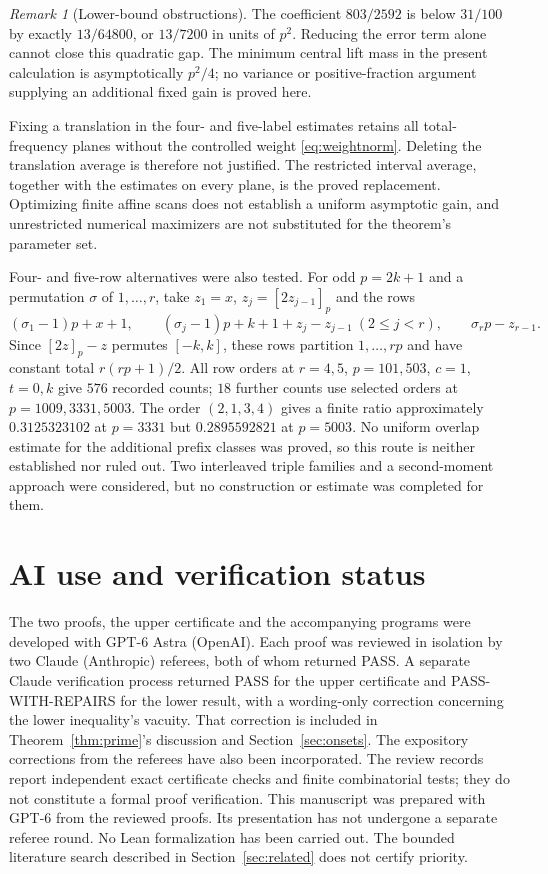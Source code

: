 \documentclass[10pt]{amsart}
\theoremstyle{remark}
\newtheorem{remark}[lemma]{Remark}
\begin{document}
\begin{remark}[Lower-bound obstructions]
The coefficient $803/2592$ is below $31/100$ by exactly $13/64800$,
or $13/7200$ in units of $p^2$. Reducing the error term alone cannot
close this quadratic gap. The minimum central lift mass in the
present calculation is asymptotically $p^2/4$; no variance or
positive-fraction argument supplying an additional fixed gain is
proved here.

Fixing a translation in the four- and five-label estimates retains
all total-frequency planes without the controlled weight
\eqref{eq:weightnorm}. Deleting the translation average is therefore
not justified. The restricted interval average, together with the
estimates on every plane, is the proved replacement.
Optimizing finite affine scans does not establish a uniform
asymptotic gain, and unrestricted numerical maximizers are not
substituted for the theorem's parameter set.

Four- and five-row alternatives were also tested. For odd $p=2k+1$
and a permutation $\sigma$ of $1,\ldots,r$, take $z_1=x$,
$z_j=[2z_{j-1}]_p$ and the rows
\[
 (\sigma_1-1)p+x+1,\qquad
 (\sigma_j-1)p+k+1+z_j-z_{j-1}\ (2\le j<r),\qquad
 \sigma_rp-z_{r-1}.
\]
Since $[2z]_p-z$ permutes $[-k,k]$, these rows partition $1,\ldots,rp$
and have constant total $r(rp+1)/2$. All row orders at $r=4,5$,
$p=101,503$, $c=1$, $t=0,k$ give $576$ recorded counts; $18$ further
counts use selected orders at $p=1009,3331,5003$.
The order $(2,1,3,4)$ gives a finite ratio approximately $0.3125323102$
at $p=3331$ but $0.2895592821$ at $p=5003$. No uniform overlap
estimate for the additional prefix classes was proved, so this
route is neither established nor ruled out. Two interleaved triple
families and a second-moment approach were considered, but no
construction or estimate was completed for them.
\end{remark}

\section*{AI use and verification status}
The two proofs, the upper certificate and the accompanying programs
were developed with GPT-6 Astra (OpenAI). Each proof was reviewed in
isolation by two Claude (Anthropic) referees, both of whom returned
PASS. A separate Claude verification process returned PASS for the
upper certificate and PASS-WITH-REPAIRS for the lower result, with a
wording-only correction concerning the lower inequality's vacuity.
That correction is included in Theorem~\ref{thm:prime}'s discussion
and Section~\ref{sec:onsets}. The expository corrections from the
referees have also been incorporated. The review records report
independent exact certificate checks and finite combinatorial tests;
they do not constitute a formal proof verification. This manuscript
was prepared with GPT-6 from the reviewed proofs. Its presentation
has not undergone a separate referee round. No Lean formalization
has been carried out. The bounded literature search described in
Section~\ref{sec:related} does not certify priority.
\end{document}
